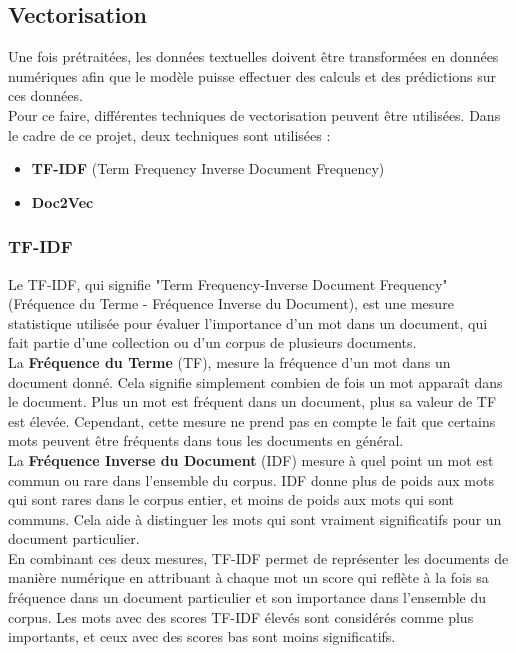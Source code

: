 \documentclass[a4paper,12pt]{article}
\begin{document}
\subsection{Vectorisation}

Une fois prétraitées, les données textuelles doivent être transformées en données numériques afin que le modèle puisse effectuer des calculs et des prédictions sur ces données.\\

Pour ce faire, différentes techniques de vectorisation peuvent être utilisées. Dans le cadre de ce projet, deux techniques sont utilisées : 
\begin{itemize}
    \item \textbf{TF-IDF} (Term Frequency Inverse Document Frequency)
    \item \textbf{Doc2Vec}
\end{itemize}

\subsubsection{TF-IDF}

Le TF-IDF, qui signifie "Term Frequency-Inverse Document Frequency" (Fréquence du Terme - Fréquence Inverse du Document), est une mesure statistique utilisée pour évaluer l'importance d'un mot dans un document, qui fait partie d'une collection ou d'un corpus de plusieurs documents.\\

La \textbf{Fréquence du Terme} (TF), mesure la fréquence d'un mot dans un document donné. Cela signifie simplement combien de fois un mot apparaît dans le document. Plus un mot est fréquent dans un document, plus sa valeur de TF est élevée. Cependant, cette mesure ne prend pas en compte le fait que certains mots peuvent être fréquents dans tous les documents en général.\\

La \textbf{Fréquence Inverse du Document} (IDF) mesure à quel point un mot est commun ou rare dans l'ensemble du corpus. IDF donne plus de poids aux mots qui sont rares dans le corpus entier, et moins de poids aux mots qui sont communs. Cela aide à distinguer les mots qui sont vraiment significatifs pour un document particulier.\\

En combinant ces deux mesures, TF-IDF permet de représenter les documents de manière numérique en attribuant à chaque mot un score qui reflète à la fois sa fréquence dans un document particulier et son importance dans l'ensemble du corpus. Les mots avec des scores TF-IDF élevés sont considérés comme plus importants, et ceux avec des scores bas sont moins significatifs.\\
\end{document}
